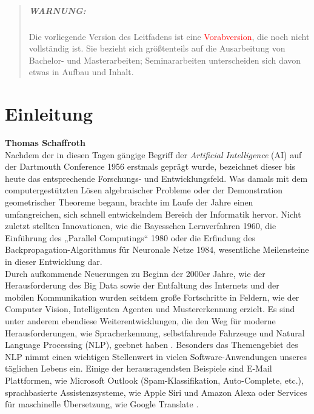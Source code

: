 \documentclass[bachelor,german]{info1thesis}
\begin{document}
\begin{abstract}
    \paragraph{WARNUNG:} 
    Die vorliegende Version des Leitfadens ist eine \textcolor{red}{Vorabversion}, die noch nicht vollständig ist.
    Sie bezieht sich größtenteils auf die Ausarbeitung von Bachelor- und Masterarbeiten; Seminararbeiten unterscheiden sich davon etwas in Aufbau und Inhalt.

\end{abstract}

\thesistableofcontents

\chapter{Einleitung}
\textbf{Thomas Schaffroth} \\
Nachdem der in diesen Tagen gängige Begriff der \textit{Artificial Intelligence} (AI) auf der Dartmouth Conference 1956 erstmals geprägt wurde, bezeichnet dieser bis heute das entsprechende Forschungs- und Entwicklungsfeld. Was damals mit dem computergestützten Lösen algebraischer Probleme oder der Demonstration geometrischer Theoreme begann, brachte im Laufe der Jahre einen umfangreichen, sich schnell entwickelndem Bereich der Informatik hervor. Nicht zuletzt stellten Innovationen, wie die Bayesschen Lernverfahren 1960, die Einführung des „Parallel Computings“ 1980 oder die Erfindung des Backpropagation-Algorithmus für Neuronale Netze 1984, wesentliche Meilensteine in dieser Entwicklung dar. \\
Durch aufkommende Neuerungen zu Beginn der 2000er Jahre, wie der Herausforderung des Big Data sowie der Entfaltung des Internets und der mobilen Kommunikation wurden seitdem große Fortschritte in Feldern, wie der Computer Vision, Intelligenten Agenten und Mustererkennung erzielt. Es sind unter anderem ebendiese Weiterentwicklungen, die den Weg für moderne Herausforderungen, wie Spracherkennung, selbstfahrende Fahrzeuge und Natural Language Processing (NLP), geebnet haben \cite{Perez2018}.
Besonders das Themengebiet des NLP nimmt einen wichtigen Stellenwert in vielen Software-Anwendungen unseres täglichen Lebens ein. Einige der herausragendsten Beispiele sind E-Mail Plattformen, wie Microsoft Outlook (Spam-Klassifikation, Auto-Complete, etc.), sprachbasierte Assistenzsysteme, wie Apple Siri und Amazon Alexa oder Services für maschinelle Übersetzung, wie Google Translate \cite{Vajjala2020}. \\
\end{document}
